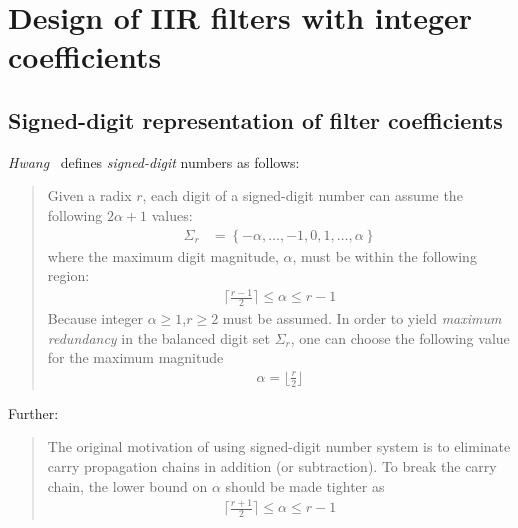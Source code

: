 \documentclass[a4paper,twoside,10pt,english]{report}
\begin{document}
\cleardoublepage
\part{\label{part:IIR-filters-fixed-point-coefficients}Design of IIR filters with integer coefficients}
\cleardoublepage
\chapter{\label{sec:Signed-digit-representation-filter-coefficients}Signed-digit representation of filter coefficients}
\emph{Hwang}~\cite[Section 1.5]{Hwang_ComputerArithmetic} defines 
\emph{signed-digit} numbers as follows:
\begin{quotation}
Given a radix $r$, each digit of a signed-digit number can assume the following
$2\alpha+1$ values:
\begin{align*}
\Sigma_{r}&=\left\{-\alpha,\hdots,-1,0,1,\hdots,\alpha\right\}
\end{align*}
where the maximum digit magnitude, $\alpha$, must be within the following
region:
\begin{align*}
\lceil\frac{r-1}{2}\rceil\le\alpha\le r-1
\end{align*}
Because integer $\alpha\ge 1$,$r\ge 2$ must be assumed. In order to yield
\emph{maximum redundancy} in the balanced digit set $\Sigma_{r}$, one can choose
the following value for the maximum magnitude
\begin{align*}
\alpha=\lfloor\frac{r}{2}\rfloor
\end{align*}
\end{quotation}
Further:
\begin{quotation}
The original motivation of using signed-digit number system is to eliminate
carry propagation chains in addition (or subtraction). To break the carry chain,
the lower bound on $\alpha$ should be made tighter as
\begin{align*}
\lceil\frac{r+1}{2}\rceil\le\alpha\le r-1
\end{align*}
\end{quotation}
\end{document}
